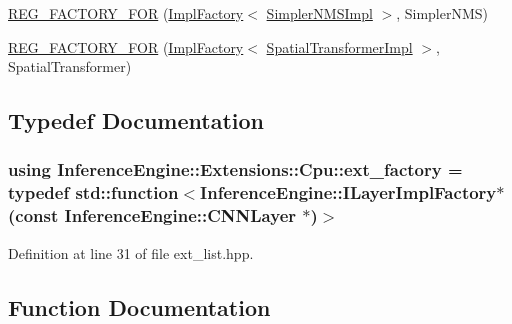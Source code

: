 \begin{DoxyCompactItemize}
\item 
\hyperlink{namespaceInferenceEngine_1_1Extensions_1_1Cpu_a9f457ee5ce0d556f36f472a85c6cd127}{R\+E\+G\+\_\+\+F\+A\+C\+T\+O\+R\+Y\+\_\+\+F\+OR} (\hyperlink{classInferenceEngine_1_1Extensions_1_1Cpu_1_1ImplFactory}{Impl\+Factory}$<$ \hyperlink{classInferenceEngine_1_1Extensions_1_1Cpu_1_1SimplerNMSImpl}{Simpler\+N\+M\+S\+Impl} $>$, Simpler\+N\+MS)
\item 
\hyperlink{namespaceInferenceEngine_1_1Extensions_1_1Cpu_a70ce7d9a14fc246ec99338fd2c4d6756}{R\+E\+G\+\_\+\+F\+A\+C\+T\+O\+R\+Y\+\_\+\+F\+OR} (\hyperlink{classInferenceEngine_1_1Extensions_1_1Cpu_1_1ImplFactory}{Impl\+Factory}$<$ \hyperlink{classInferenceEngine_1_1Extensions_1_1Cpu_1_1SpatialTransformerImpl}{Spatial\+Transformer\+Impl} $>$, Spatial\+Transformer)
\end{DoxyCompactItemize}


\subsection{Typedef Documentation}
\subsubsection[{\texorpdfstring{ext\+\_\+factory}{ext_factory}}]{\setlength{\rightskip}{0pt plus 5cm}using {\bf Inference\+Engine\+::\+Extensions\+::\+Cpu\+::ext\+\_\+factory} = typedef std\+::function$<$Inference\+Engine\+::\+I\+Layer\+Impl\+Factory$\ast$(const Inference\+Engine\+::\+C\+N\+N\+Layer $\ast$)$>$}\hypertarget{namespaceInferenceEngine_1_1Extensions_1_1Cpu_af4abba10662fceb8a076b617209801ed}{}\label{namespaceInferenceEngine_1_1Extensions_1_1Cpu_af4abba10662fceb8a076b617209801ed}


Definition at line 31 of file ext\+\_\+list.\+hpp.



\subsection{Function Documentation}
